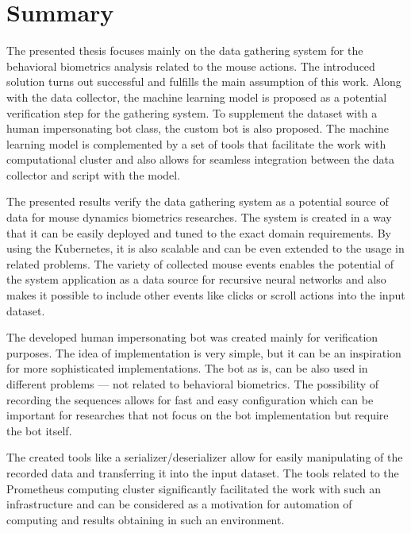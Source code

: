 \section{Summary}\label{sec:summary}
The presented thesis focuses mainly on the data gathering system for the behavioral biometrics analysis related to the mouse actions.
The introduced solution turns out successful and fulfills the main assumption of this work.
Along with the data collector, the machine learning model is proposed as a potential verification step for the gathering system.
To supplement the dataset with a human impersonating bot class, the custom bot is also proposed.
The machine learning model is complemented by a set of tools that facilitate the work with computational cluster and also allows for seamless integration between the data collector and script with the model.

The presented results verify the data gathering system as a potential source of data for mouse dynamics biometrics researches.
The system is created in a way that it can be easily deployed and tuned to the exact domain requirements.
By using the Kubernetes, it is also scalable and can be even extended to the usage in related problems.
The variety of collected mouse events enables the potential of the system application as a data source for recursive neural networks and also makes it possible to include other events like clicks or scroll actions into the input dataset.

The developed human impersonating bot was created mainly for verification purposes.
The idea of implementation is very simple, but it can be an inspiration for more sophisticated implementations.
The bot as is, can be also used in different problems --- not related to behavioral biometrics.
The possibility of recording the sequences allows for fast and easy configuration which can be important for researches that not focus on the bot implementation but require the bot itself.

The created tools like a serializer/deserializer allow for easily manipulating of the recorded data and transferring it into the input dataset.
The tools related to the Prometheus computing cluster significantly facilitated the work with such an infrastructure and can be considered as a motivation for automation of computing and results obtaining in such an environment.

